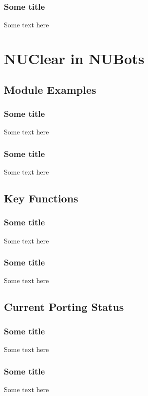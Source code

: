 \documentclass{beamer}
\begin{document}
\begin{frame}
    \frametitle{Some title}
    Some text here
\end{frame}

\section{NUClear in NUBots}
\subsection{Module Examples}
\begin{frame}
    \frametitle{Some title}
    Some text here
\end{frame}

\begin{frame}
    \frametitle{Some title}
    Some text here
\end{frame}

\subsection{Key Functions}
\begin{frame}
    \frametitle{Some title}
    Some text here
\end{frame}

\begin{frame}
    \frametitle{Some title}
    Some text here
\end{frame}

\subsection{Current Porting Status}
\begin{frame}
    \frametitle{Some title}
    Some text here
\end{frame}

\begin{frame}
    \frametitle{Some title}
    Some text here
\end{frame}
\end{document}
